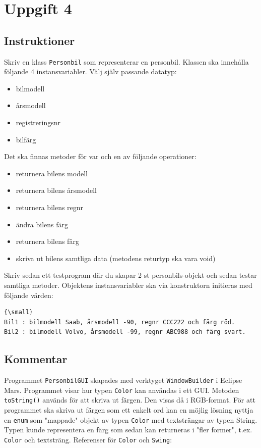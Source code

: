 \section{Uppgift 4}\label{sec:uppg04}

\subsection{Instruktioner}
Skriv en klass \texttt{Personbil} som representerar en personbil. Klassen ska
innehålla följande 4 instansvariabler. Välj själv passande datatyp:

\begin{itemize}
\itemsep1pt\parskip0pt
\item bilmodell
\item årsmodell
\item registreringsnr
\item bilfärg
\end{itemize}

Det ska finnas metoder för var och en av följande operationer:

\begin{itemize}
\itemsep1pt\parskip0pt
\item returnera bilens modell
\item returnera bilens årsmodell
\item returnera bilens regnr
\item ändra bilens färg
\item returnera bilens färg
\item skriva ut bilens samtliga data (metodens returtyp ska vara void)
\end{itemize}

Skriv sedan ett testprogram där du skapar 2 st personbils-objekt och sedan
testar samtliga metoder. Objektens instansvariabler ska via konstruktorn
initieras med följande värden:

\begin{verbatim}{\small}
Bil1 : bilmodell Saab, årsmodell -90, regnr CCC222 och färg röd.
Bil2 : bilmodell Volvo, årsmodell -99, regnr ABC988 och färg svart.
\end{verbatim}


\subsection{Kommentar}
Programmet \texttt{PersonbilGUI} skapades med verktyget \texttt{WindowBuilder}
i Eclipse Mars. Programmet visar hur typen \texttt{Color} kan användas i ett
GUI.  Metoden \texttt{toString()} används för att skriva ut färgen. Den visas
då i RGB-format. För att programmet ska skriva ut färgen som ett enkelt ord kan
en möjlig lösning nyttja en \texttt{enum} som "mappade" objekt av typen
\texttt{Color} med textsträngar av typen String. Typen kunde representera en
färg som sedan kan returneras i "fler former", t.ex. \texttt{Color} och
textsträng.
Referenser för \texttt{Color} och \texttt{Swing}:


